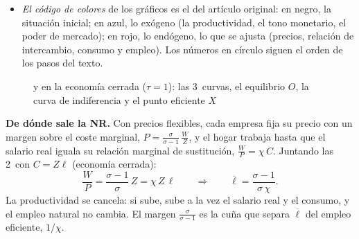 \documentclass[11pt]{article}
\begin{document}
\begin{itemize}
\begin{itemize}
  \item \emph{La tasa natural}: el empleo con precios flexibles, una vertical.
  No depende de la productividad y sí del poder de mercado: cuanto menor es $\sigma$ (variedades más diferenciadas, mayor margen), menos se trabaja; con competencia perfecta ($\sigma\to\infty$) sería el empleo eficiente, $1/\chi$.
  \item \emph{El tipo de cambio}: el cociente de los tonos monetarios. Con mercados completos, una política más expansiva en A deprecia su moneda .
  \end{itemize}
\item \emph{El código de colores} de los gráficos es el del artículo original: en negro, la situación inicial; en azul, lo exógeno (la productividad, el tono monetario, el poder de mercado); en rojo, lo endógeno, lo que se ajusta (precios, relación de intercambio, consumo y empleo). Los números en círculo siguen el orden de los pasos del texto.
\end{itemize}

\begin{figure}[H]
\centering
\caption{ y  en la economía cerrada ($\tau=1$): las 3~curvas, el equilibrio $O$, la curva de indiferencia y el punto eficiente $X$}\label{fig:cp-cerrada-paso2}
\end{figure}

\begin{anotaciones}
\textbf{De dónde sale la NR.} Con precios flexibles, cada empresa fija su precio con un margen sobre el coste marginal, $P=\frac{\sigma}{\sigma-1}\,\frac{W}{Z}$, y el hogar trabaja hasta que el salario real iguala su relación marginal de sustitución, $\frac{W}{P}=\chi\,C$. Juntando las 2~con $C=Z\ell$ (economía cerrada):
\[
\frac{W}{P}=\frac{\sigma-1}{\sigma}\,Z=\chi\,Z\,\ell\qquad\Longrightarrow\qquad \overline{\ell}=\frac{\sigma-1}{\sigma\,\chi}.
\]
La productividad se cancela: si sube, sube a la vez el salario real y el consumo, y el empleo natural no cambia. El margen $\frac{\sigma}{\sigma-1}$ es la cuña que separa $\overline{\ell}$ del empleo eficiente, $1/\chi$\nocite{CorsettiPesenti2005}.
\end{anotaciones}
\end{document}
